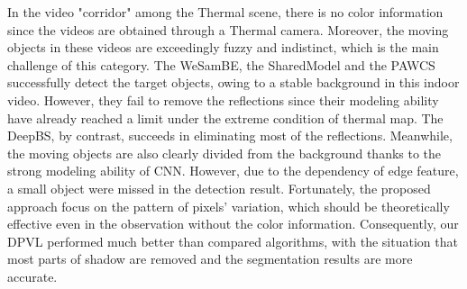 \documentclass[journal]{IEEEtran}
\begin{document}
In the video "corridor" among the Thermal scene, there is no color information since the videos are obtained through a Thermal camera. 
Moreover, the moving objects in these videos are exceedingly fuzzy and indistinct, which is the main challenge of this category. 
The WeSamBE, the SharedModel and the PAWCS successfully detect the target objects, owing to a stable background in this indoor video. 
However, they fail to remove the reflections since their modeling ability have already reached a limit under the extreme condition of thermal map. 
The DeepBS, by contrast, succeeds in eliminating most of the reflections. 
Meanwhile, the moving objects are also clearly divided from the background thanks to the strong modeling ability of CNN. 
However, due to the dependency of edge feature, a small object were missed in the detection result. 
Fortunately, the proposed approach focus on the pattern of pixels' variation, which should be theoretically effective even in the observation without the color information. 
Consequently, our DPVL performed much better than compared algorithms, with the situation that most parts of shadow are removed and the segmentation results are more accurate.
\end{document}
